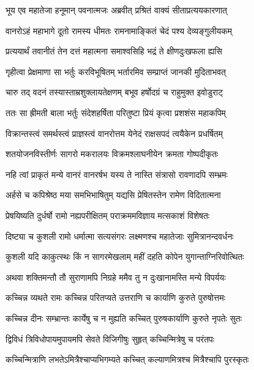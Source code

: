 
\twolineshloka
{भूय एव महातेजा हनूमान् पवनात्मजः}
{अब्रवीत् प्रश्रितं वाक्यं सीताप्रत्ययकारणात्} %

\twolineshloka
{वानरोऽहं महाभागे दूतो रामस्य धीमतः}
{रामनामाङ्कितं चेदं पश्य देव्यङ्गुलीयकम्} %

\twolineshloka
{प्रत्ययार्थं तवानीतं तेन दत्तं महात्मना}
{समाश्वसिहि भद्रं ते क्षीणदुःखफला ह्यसि} %

\twolineshloka
{गृहीत्वा प्रेक्षमाणा सा भर्तुः करविभूषितम्}
{भर्तारमिव सम्प्राप्तं जानकी मुदिताभवत्} %

\twolineshloka
{चारु तद् वदनं तस्यास्ताम्रशुक्लायतेक्षणम्}
{बभूव हर्षोदग्रं च राहुमुक्त इवोडुराट्} %

\twolineshloka
{ततः सा ह्रीमती बाला भर्तुः संदेशहर्षिता}
{परितुष्टा प्रियं कृत्वा प्रशशंस महाकपिम्} %

\twolineshloka
{विक्रान्तस्त्वं समर्थस्त्वं प्राज्ञस्त्वं वानरोत्तम}
{येनेदं राक्षसपदं त्वयैकेन प्रधर्षितम्} %

\twolineshloka
{शतयोजनविस्तीर्णः सागरो मकरालयः}
{विक्रमश्लाघनीयेन क्रमता गोष्पदीकृतः} %

\twolineshloka
{नहि त्वां प्राकृतं मन्ये वानरं वानरर्षभ}
{यस्य ते नास्ति संत्रासो रावणादपि सम्भ्रमः} %

\twolineshloka
{अर्हसे च कपिश्रेष्ठ मया समभिभाषितुम्}
{यद्यसि प्रेषितस्तेन रामेण विदितात्मना} %

\twolineshloka
{प्रेषयिष्यति दुर्धर्षो रामो नह्यपरीक्षितम्}
{पराक्रममविज्ञाय मत्सकाशं विशेषतः} %

\twolineshloka
{दिष्ट्या च कुशली रामो धर्मात्मा सत्यसंगरः}
{लक्ष्मणश्च महातेजाः सुमित्रानन्दवर्धनः} %

\twolineshloka
{कुशली यदि काकुत्स्थः किं न सागरमेखलाम्}
{महीं दहति कोपेन युगान्ताग्निरिवोत्थितः} %

\twolineshloka
{अथवा शक्तिमन्तौ तौ सुराणामपि निग्रहे}
{ममैव तु न दुःखानामस्ति मन्ये विपर्ययः} %

\twolineshloka
{कच्चिन्न व्यथते रामः कच्चिन्न परितप्यते}
{उत्तराणि च कार्याणि कुरुते पुरुषोत्तमः} %

\twolineshloka
{कच्चिन्न दीनः सम्भ्रान्तः कार्येषु च न मुह्यति}
{कच्चित् पुरुषकार्याणि कुरुते नृपतेः सुतः} %

\twolineshloka
{द्विविधं त्रिविधोपायमुपायमपि सेवते}
{विजिगीषुः सुहृत् कच्चिन्मित्रेषु च परंतपः} %

\twolineshloka
{कच्चिन्मित्राणि लभतेऽमित्रैश्चाप्यभिगम्यते}
{कच्चित् कल्याणमित्रश्च मित्रैश्चापि पुरस्कृतः} %

